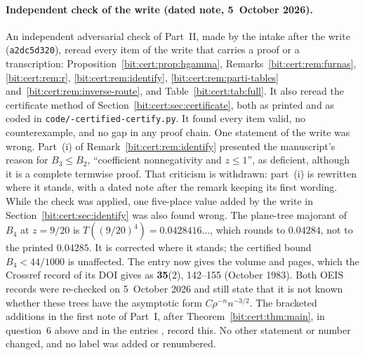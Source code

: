 \documentclass[11pt]{article}
\theoremstyle{definition}\newtheorem{definition}[theorem]{Definition}
\theoremstyle{remark}\newtheorem{remark}[theorem]{Remark}
\begin{document}
\paragraph{Independent check of the write (dated note, 5~October 2026).}
An independent adversarial check of Part~II, made by the intake after the
write (\texttt{a2dc5d320}), reread every item of the write that carries a
proof or a transcription: Proposition~\ref{bit:cert:prop:hgamma},
Remarks~\ref{bit:cert:rem:furnas}, \ref{bit:cert:rem:r},
\ref{bit:cert:rem:identify}, \ref{bit:cert:rem:parti-tables}
and~\ref{bit:cert:rem:inverse-route}, and Table~\ref{bit:cert:tab:full}. It
also reread the certificate method of Section~\ref{bit:cert:sec:certificate},
both as printed and as coded in
\texttt{code/-certified-\allowbreak certify.py}. It found every
item valid, no counterexample, and no gap in any proof chain. One statement of
the write was wrong. Part~(i) of Remark~\ref{bit:cert:rem:identify} presented
the manuscript's reason for $B_3\le B_2$, ``coefficient nonnegativity and
$z\le1$'', as deficient, although it is a complete termwise proof. That
criticism is withdrawn: part~(i) is rewritten where it stands, with a dated
note after the remark keeping its first wording. While the check was applied,
one five-place value added by the write in Section~\ref{bit:cert:sec:identify}
was also found wrong. The plane-tree majorant of $B_4$ at $z=9/20$ is
$T((9/20)^4)=0.0428416\ldots$, which rounds to $0.04284$, not to the printed
$0.04285$. It is corrected where it stands; the certified bound $B_4<44/1000$
is unaffected. The entry \cite{mmm} now gives the volume and pages, which the
Crossref record of its DOI gives as \textbf{35}(2), 142--155 (October 1983).
Both OEIS records were re-checked on 5~October 2026 and still state that it is
not known whether these trees have the asymptotic form $C\rho^{-n}n^{-3/2}$.
The bracketed additions in the first note of Part~I, after
Theorem~\ref{bit:cert:thm:main}, in question~6 above and in the entries
\cite{oeis3}, \cite{oeis4} record this. No other statement or number changed,
and no label was added or renumbered.
\end{document}
